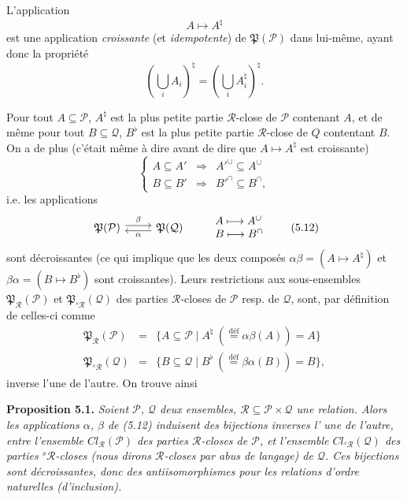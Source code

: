 \documentclass[11pt]{article}
\newcommand{\printedpage}[1]{\marginpar{\footnotesize p.~#1}}
\def\dcprintedpending{}
\newcommand{\msp}[1]{\marginpar{\footnotesize\raggedright
  \ifx\dcprintedpending\empty\else p.~\dcprintedpending\par\fi
  [#1]}\gdef\dcprintedpending{}}
\newcommand{\cP}{\mathcal{P}}
\newcommand{\cQ}{\mathcal{Q}}
\newcommand{\cR}{\mathcal{R}}
\newcommand{\fP}{\mathfrak{P}}
\newcommand{\sR}{{}^{s}\mathcal{R}}
\begin{document}
L'application
\[
A \longmapsto A^{\natural}
\tag*{(5.10)}
\]
est une application \textit{croissante} (et \textit{idempotente}) de $\fP(\cP)$ dans lui-même, ayant donc la propriété
\msp{72}
\[
(\bigcup_i A_i)^{\natural} = (\bigcup_i A_i^{\natural})^{\natural}.
\]

\printedpage{45}

Pour tout $A \subseteq \cP$, $A^{\natural}$ est la plus petite partie $\cR$-close de $\cP$ contenant $A$, et de même pour tout $B \subseteq \cQ$, $B^{\flat}$ est la plus petite partie $\cR$-close de $Q$ contentant $B$. On a de plus (c'était même à dire avant de dire que $A \longmapsto A^{\natural}$ est croissante) %
\[
\left\{
\begin{array}{rcl}
A \subseteq A' & \Longrightarrow & A'^{\cup} \subseteq A^{\cup}\\[1ex]
B \subseteq B' & \Longrightarrow & B'^{\cap} \subseteq B^{\cap},
\end{array}
\right.
\tag*{(5.11)}
\]
i.e. les applications
\[
\begin{tikzcd}
\fP(\cP) \arrow[r, shift left, "\beta"] & \fP(\cQ) \arrow[l, shift left, "\alpha"]
\end{tikzcd}
\qquad
\begin{array}{l}
A \longmapsto A^{\cup}\\
B \longmapsto B^{\cap}
\end{array}
\tag*{(5.12)}
\]
sont décroissantes (ce qui implique que les deux composés $\alpha\beta = (A \longmapsto A^{\natural})$ et $\beta\alpha = (B \longmapsto B^{\flat})$ sont croissantes). Leurs restrictions aux sous-ensembles $\fP_{\cR}(\cP)$ et $\fP_{\sR}(\cQ)$ des parties $\cR$-closes de $\cP$ resp. de $\cQ$, sont, par définition de celles-ci comme
\[
\begin{array}{rcl}
\fP_{\cR}(\cP) & = & \{A \subseteq \cP \mid A^{\natural} \ (\overset{\text{déf}}{=} \alpha\beta(A)) = A\}\\
\fP_{\sR}(\cQ) & = & \{B \subseteq \cQ \mid B^{\flat} \ (\overset{\text{déf}}{=} \beta\alpha(B)) = B\},
\end{array}
\]
inverse l'une de l'autre. On trouve ainsi

\textbf{Proposition 5.1.} \textit{Soient $\cP$, $\cQ$ deux ensembles, $\cR \subseteq \cP \times \cQ$ une relation. Alors les applications $\alpha$, $\beta$ de (5.12) induisent des bijections inverses l'}
\msp{73}
\textit{une de l'autre, entre l'ensemble $\mathit{Cl}_{\cR}(\cP)$ des parties $\cR$-closes de $\cP$, et l'ensemble $\mathit{Cl}_{\sR}(\cQ)$ des parties ${}^{s}\cR$-closes (nous dirons $\cR$-closes par abus de langage) de $\cQ$. Ces bijections sont décroissantes, donc des antiisomorphismes pour les relations d'ordre naturelles (d'inclusion).}
\end{document}
